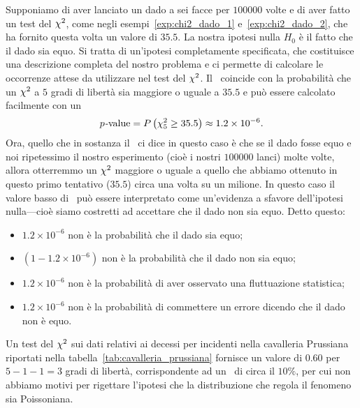 \begin{examplebox}
  \begin{example}
    Supponiamo di aver lanciato un dado a sei facce per $100000$ volte e di
    aver fatto un test del $\chi^2$, come negli esempi~\ref{exp:chi2_dado_1}
    e~\ref{exp:chi2_dado_2}, che ha fornito questa volta un valore di $35.5$.
    La nostra ipotesi nulla $H_0$ è il fatto che il dado sia equo.
    Si tratta di un'ipotesi completamente specificata, che costituisce una
    descrizione completa del nostro problema e ci permette di calcolare le
    occorrenze attese da utilizzare nel test del $\chi^2$.
    Il \pvalue\ coincide con la probabilità che un $\chi^2$ a $5$ gradi di
    libertà sia maggiore o uguale a $35.5$ e può essere calcolato facilmente
    con un 
    \begin{align*}
      \text{\emph{$p$-\emph{value}}} = \displaystyle P\left(\chi^2_5 \geq 35.5\right) \approx 1.2 \times 10^{-6}.
    \end{align*}
    Ora, quello che in sostanza il \pvalue\ ci dice in questo caso è che
    se il dado fosse equo e noi ripetessimo il nostro esperimento (cioè i
    nostri $100000$ lanci) molte volte, allora otterremmo un $\chi^2$ maggiore
    o uguale a quello che abbiamo ottenuto in questo primo tentativo ($35.5$)
    circa una volta su un milione.
    In questo caso il valore basso di \pvalue\ può essere interpretato come
    un'evidenza a sfavore dell'ipotesi nulla---cioè siamo costretti ad
    accettare che il dado non sia equo. Detto questo:
    \begin{itemize}
    \item $1.2 \times 10^{-6}$ non è la probabilità che il dado sia equo;
    \item $(1 - 1.2 \times 10^{-6})$ non è la probabilità che il dado non
      sia equo;
    \item $1.2 \times 10^{-6}$ non è la probabilità di aver osservato una
      fluttuazione statistica;
    \item $1.2 \times 10^{-6}$ non è la probabilità di commettere un errore
      dicendo che il dado non è equo.
    \end{itemize}
  \end{example}

    \begin{example}
    Un test del $\chi^2$ sui dati relativi ai decessi per incidenti nella
    cavalleria Prussiana riportati nella tabella~\ref{tab:cavalleria_prussiana}
    fornisce un valore di $0.60$ per $5 - 1 - 1 = 3$ gradi di libertà,
    corrispondente ad un \pvalue\ di circa il $10\%$, per cui non abbiamo motivi
    per rigettare l'ipotesi che la distribuzione che regola il fenomeno sia
    Poissoniana.
  \end{example}


\end{examplebox}
